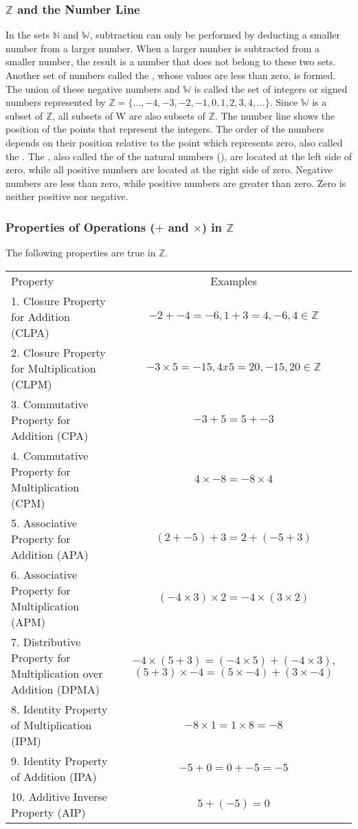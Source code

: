 \subsubsection*{$\mathbb{Z}$ and the Number Line}
In the sets $\mathbb N$ and $\mathbb W$, subtraction can only be performed by deducting a smaller number from
a larger number. When a larger number is subtracted from a smaller number, the result is a number
that does not belong to these two sets. Another set of numbers called the , whose
values are less than zero, is formed. The union of these negative numbers and $\mathbb W$ is called the set of
integers or signed numbers represented by $\mathbb Z = \{\ldots, -4, -3, -2, -1, 0, 1, 2, 3, 4, \ldots\}$. Since $\mathbb W$ is a subset
of $\mathbb Z$, all subsets of W are also subsets of $\mathbb Z$. The number line shows the position of the points that
represent the integers. The order of the numbers depends on their position relative to the point
which represents zero, also called the . The , also called the 
of the natural numbers (), are located at the left side of zero, while all positive
numbers are located at the right side of zero. Negative numbers are less than zero, while positive
numbers are greater than zero. Zero is neither positive nor negative.
\subsubsection*{Properties of Operations ($+$ and $\times$) in $\mathbb Z$}
The following properties are true in $\mathbb Z$.

\begin{tabularx}{\linewidth}{XC}
Property & Examples\\
1. Closure Property for Addition (CLPA) & $-2+-4=-6,1 + 3 = 4, -6,4 \in \mathbb Z$\\
2. Closure Property for Multiplication (CLPM) & $-3\times 5=-15,4 x 5 = 20, -15,20 \in \mathbb Z$\\
3. Commutative Property for Addition (CPA) & $-3+5=5+-3$\\
4. Commutative Property for Multiplication (CPM) & $4\times -8=-8\times 4$\\
5. Associative Property for Addition (APA) & $(2 + -5) + 3 = 2 + (-5 + 3)$\\
6. Associative Property for Multiplication (APM) & $(-4 \times 3) \times 2 = -4 \times (3 \times 2)$\\
7. Distributive Property for Multiplication over Addition (DPMA) & $-4 \times (5 + 3) = (-4 \times 5) + (-4 \times 3)$, $(5 + 3) \times -4 = (5 \times -4) + (3 \times -4)$\\
8. Identity Property of Multiplication (IPM) & $-8\times1=1\times8=-8$\\
9. Identity Property of Addition (IPA) & $-5 + 0 = 0 + -5 = -5$\\
10. Additive Inverse Property (AIP) & $5 + (-5) = 0$\\
\end{tabularx}

